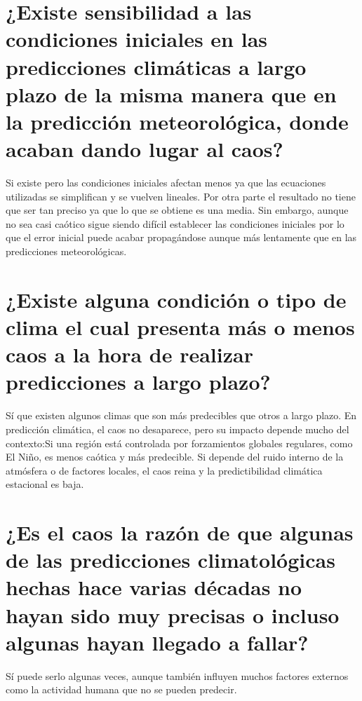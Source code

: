 \documentclass[
  10pt,
  a4paper,
  DIV=11,
  numbers=noendperiod,
  open=any]{scrreprt}
\numberwithin{equation}{chapter}
\numberwithin{equation}{chapter}
\renewcommand{\[}{\begin{equation}}
\renewcommand{\]}{\end{equation}}
\begin{document}
\section{¿Existe sensibilidad a las condiciones iniciales en las
predicciones climáticas a largo plazo de la misma manera que en la
predicción meteorológica, donde acaban dando lugar al
caos?}\label{existe-sensibilidad-a-las-condiciones-iniciales-en-las-predicciones-climuxe1ticas-a-largo-plazo-de-la-misma-manera-que-en-la-predicciuxf3n-meteoroluxf3gica-donde-acaban-dando-lugar-al-caos}

Si existe pero las condiciones iniciales afectan menos ya que las
ecuaciones utilizadas se simplifican y se vuelven lineales. Por otra
parte el resultado no tiene que ser tan preciso ya que lo que se obtiene
es una media. Sin embargo, aunque no sea casi caótico sigue siendo
difícil establecer las condiciones iniciales por lo que el error inicial
puede acabar propagándose aunque más lentamente que en las predicciones
meteorológicas.

\section{¿Existe alguna condición o tipo de clima el cual presenta más o
menos caos a la hora de realizar predicciones a largo
plazo?}\label{existe-alguna-condiciuxf3n-o-tipo-de-clima-el-cual-presenta-muxe1s-o-menos-caos-a-la-hora-de-realizar-predicciones-a-largo-plazo}

Sí que existen algunos climas que son más predecibles que otros a largo
plazo. En predicción climática, el caos no desaparece, pero su impacto
depende mucho del contexto:Si una región está controlada por
forzamientos globales regulares, como El Niño, es menos caótica y más
predecible. Si depende del ruido interno de la atmósfera o de factores
locales, el caos reina y la predictibilidad climática estacional es
baja.

\section{¿Es el caos la razón de que algunas de las predicciones
climatológicas hechas hace varias décadas no hayan sido muy precisas o
incluso algunas hayan llegado a
fallar?}\label{es-el-caos-la-razuxf3n-de-que-algunas-de-las-predicciones-climatoluxf3gicas-hechas-hace-varias-duxe9cadas-no-hayan-sido-muy-precisas-o-incluso-algunas-hayan-llegado-a-fallar}

Sí puede serlo algunas veces, aunque también influyen muchos factores
externos como la actividad humana que no se pueden predecir.
\end{document}
